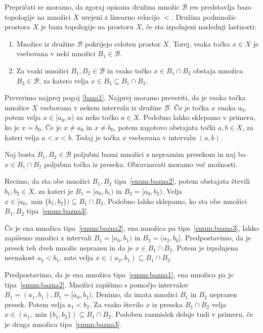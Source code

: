 \documentclass[../TG_magistrsko_delo_sections.tex]{subfiles}
\begin{document}
Prepričati se moramo, da zgoraj opisana družina množic $\mathcal{B}$ res predstavlja bazo topologije na množici $X$ urejeni z linearno relacijo $<$. Družina podmnožic prostora $X$ je baza topologije na prostoru $X$, če sta izpolnjeni naslednji lastnosti:
\begin{enumerate}[label={(b\arabic*)}]
\item Množice iz družine $\mathcal{B}$ pokrijejo celoten prostor $X$. Torej, vsaka točka $x \in X$ je vsebovana v neki množici $B_1 \in \mathcal{B}$. \label{baza1}
\item Za vsaki množici $B_1, B_2 \in \mathcal{B}$ in vsako točko $x\in B_1 \cap B_2$ obstaja množica $B_3 \in \mathcal{B}$, za katero velja $x \in B_3 \subseteq B_1 \cap B_2$.\label{baza2}
\end{enumerate}

Preverimo najprej pogoj \ref{baza1}.
Najprej moramo preveriti, da je vsaka točka množice $X$ vsebovana v nekem intervalu iz družine $\mathcal{B}$. Če je točka $x$ enaka $a_0$, potem velja $x \in [a_0, a)$ za neko točko $a \in X$. Podobno lahko sklepamo v primeru, ko je $x = b_0$. Če je $x \neq a_0$ in $x \neq b_0$, potem zagotovo obstajata točki $a, b \in X$, za kateri velja $a < x < b$. Tedaj je točka $x$ vsebovana v intervalu $(a, b)$.

Naj bosta $B_1, B_2 \in \mathcal{B}$ poljubni bazni množici z nepraznim presekom in naj bo $x \in B_1 \cap B_2$ poljubna točka iz preseka. Obravnavati moramo več možnosti. 

Recimo, da sta obe množici $B_1, B_2$ tipa~\ref{enum:bazna2}, potem obstajata števili $b_1, b_2 \in X$, za kateri je $B_1 = [a_0, b_1)$ in $B_2 = [a_0, b_2)$. Velja $x \in [a_0, \min\{b_1, b_2\}) \subseteq B_1 \cap B_2$. Podobno lahko sklepamo, ko sta obe množici $B_1, B_2$ tipa~\ref{enum:bazna3}.

Če je ena množica tipa~\ref{enum:bazna2}, ena množica pa tipa~\ref{enum:bazna3}, lahko zapišemo množici z intervali $B_1 = [a_0, b_1)$ in $B_2 = (a_2, b_0]$. Predpostavimo, da je presek teh dveh množic neprazen in da je $x \in B_1 \cap B_2$. Potem je izpolnjena neenakost $a_2 < b_1$, zato velja $x \in (a_2, b_1) \subseteq B_1 \cap B_2$.

Predpostavimo, da je ena množica tipa~\ref{enum:bazna1}, ena množica pa je tipa~\ref{enum:bazna2}. Množici zapišimo s pomočjo intervalov $B_1 = (a_1, b_1), B_1 = [a_0, b_2)$. Denimo, da imata množici $B_1$ in $B_2$ neprazen presek. Potem velja $a_1 < b_2$. Za vsako število $x$ iz preseka $B_1 \cap B_2$ velja $x \in (a_1, \min\{b_1, b_2\}) \subseteq B_1 \cap B_2$. Podoben razmislek deluje tudi v primeru, če je druga množica tipa~\ref{enum:bazna3}.
\end{document}
